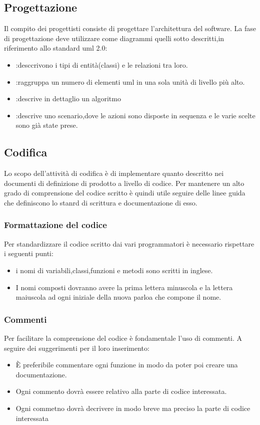 	\subsection{Progettazione}
	Il compito dei progettisti consiste di progettare l'architettura del software. %
	La fase di progettazione deve utilizzare come diagrammi  quelli sotto descritti,in riferimento allo standard uml 2.0:
	\begin{itemize}
		\item {}:desccrivono i tipi di entità(classi) e le relazioni tra loro.
		\item {}:raggruppa un numero di elementi uml in una sola unità di livello più alto.
		\item {}:descrive in dettaglio un algoritmo
		\item {}:descrive uno scenario,dove le azioni sono disposte in sequenza e le varie scelte sono già state prese.
		\end{itemize}
	\subsection{Codifica}
	Lo scopo dell'attività di codifica è di implementare quanto descritto nei documenti di definizione di prodotto a livello di codice. Per mantenere un alto grado di comprensione del codice scritto è quindi utile seguire delle linee guida che definiscono lo stanrd di scrittura e documentazione di esso.
		\subsubsection{Formattazione del codice}
		Per standardizzare il codice scritto dai vari programmatori è necessario rispettare i seguenti punti:
			\begin{itemize}
				\item i nomi di variabili,classi,funzioni e metodi sono scritti in inglese.
				\item I nomi composti dovranno avere la prima lettera minuscola e la lettera maiuscola ad ogni iniziale della nuova parloa che compone il nome.
			\end{itemize}
		\subsubsection{Commenti}
		Per facilitare la comprensione del codice è fondamentale l'uso di commenti. A seguire dei suggerimenti per il loro inserimento:
		\begin{itemize}
			\item È preferibile commentare ogni funzione in modo da poter poi creare una documentazione.
			\item Ogni commento dovrà essere relativo alla parte di codice interessata.
			\item Ogni commetno dovrà decrivere in modo breve ma preciso la parte di codice interessata
		\end{itemize}
